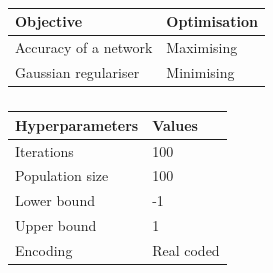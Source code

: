 \documentclass[conference]{IEEEtran}
\begin{document}
\begin{center}
\begin{table}[!ht]
\begin{tabular}{ |p{3.5cm}||p{3cm}| }
\hline
Objective &Optimisation\\
\hline
Accuracy of a network&  Maximising\\
Gaussian regulariser& Minimising\\
\hline
\end{tabular}
\label{tab1}
\caption{}
\end{table}
\end{center}
\begin{center}
\vspace{-2em}
\begin{table}[!ht]
\begin{tabular}{ |p{3.5cm}||p{3cm}| }
\hline
Hyperparameters &Values\\
\hline
Iterations&  100\\
Population size& 100\\
Lower bound& -1\\
Upper bound& 1\\
Encoding &Real coded \\
\hline
\end{tabular}
\label{tab1}
\caption{}
\end{table}
\end{center}
\vspace{-2em}
\end{document}
